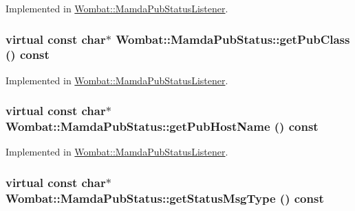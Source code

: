 Implemented in \hyperlink{classWombat_1_1MamdaPubStatusListener_48e9eaf72c6faf1bab703c5993c1adf7}{Wombat::Mamda\-Pub\-Status\-Listener}.\hypertarget{classWombat_1_1MamdaPubStatus_ebb16e566721f6f423bf09124245c50e}{
\subsubsection[getPubClass]{\setlength{\rightskip}{0pt plus 5cm}virtual const char$\ast$ Wombat::Mamda\-Pub\-Status::get\-Pub\-Class () const}}
\label{classWombat_1_1MamdaPubStatus_ebb16e566721f6f423bf09124245c50e}




Implemented in \hyperlink{classWombat_1_1MamdaPubStatusListener_838ffb83c7d46bf52b743f659dd733d9}{Wombat::Mamda\-Pub\-Status\-Listener}.\hypertarget{classWombat_1_1MamdaPubStatus_3d9fde3f554888ebb5f104c134decf60}{
\subsubsection[getPubHostName]{\setlength{\rightskip}{0pt plus 5cm}virtual const char$\ast$ Wombat::Mamda\-Pub\-Status::get\-Pub\-Host\-Name () const}}
\label{classWombat_1_1MamdaPubStatus_3d9fde3f554888ebb5f104c134decf60}




Implemented in \hyperlink{classWombat_1_1MamdaPubStatusListener_0623f4d8813595a3306cb929b518664e}{Wombat::Mamda\-Pub\-Status\-Listener}.\hypertarget{classWombat_1_1MamdaPubStatus_72d3f8a795323662c919e6f7cdd12a66}{
\subsubsection[getStatusMsgType]{\setlength{\rightskip}{0pt plus 5cm}virtual const char$\ast$ Wombat::Mamda\-Pub\-Status::get\-Status\-Msg\-Type () const}}
\label{classWombat_1_1MamdaPubStatus_72d3f8a795323662c919e6f7cdd12a66}




